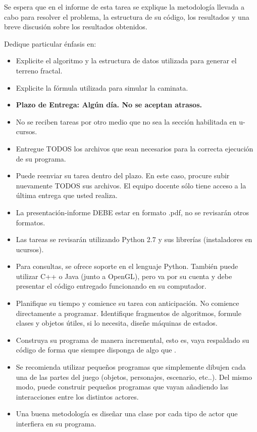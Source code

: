 \documentclass[letterpaper,11pt]{article} %
\def\plazoentrega {Algún día}
\begin{document}

Se espera que en el informe de esta tarea se explique la metodología llevada a cabo para resolver el problema, la estructura de su código, los resultados y una breve discusión sobre los resultados obtenidos. 

\newp Dedique particular énfasis en:

\begin{itemize}
	\item Explicite el algoritmo y la estructura de datos utilizada para generar el terreno fractal.
	\item Explicite la fórmula utilizada para simular la caminata.
\end{itemize}


\begin{itemize}
	\item \textbf{Plazo de Entrega: \plazoentrega. No se aceptan atrasos.}
	\item No se reciben tareas por otro medio que no sea la sección habilitada en u-cursos.
	\item Entregue TODOS los archivos que sean necesarios para la correcta ejecución de su programa.
	\item Puede reenviar su tarea dentro del plazo. En este caso, procure subir nuevamente TODOS sus archivos. El equipo docente sólo tiene acceso a la última entrega que usted realiza.
	\item La presentación-informe DEBE estar en formato .pdf, no se revisarán otros formatos.
	\item Las tareas se revisarán utilizando Python 2.7 y sus librerías (instaladores en ucursos).
	\item Para consultas, se ofrece soporte en el lenguaje Python. También puede utilizar C++ o Java (junto a OpenGL), pero va por su cuenta y debe presentar el código entregado funcionando en su computador.
\end{itemize}


\begin{itemize}
	\item Planifique su tiempo y comience su tarea con anticipación. No comience directamente a programar. Identifique fragmentos de algoritmos, formule clases y objetos útiles, si lo necesita, diseñe máquinas de estados.
	\item Construya su programa de manera incremental, esto es, vaya respaldado su código de forma que siempre disponga de algo que .
	\item Se recomienda utilizar pequeños programas que simplemente dibujen cada una de las partes del juego (objetos, personajes, escenario, etc..). Del mismo modo, puede construir pequeños programas que vayan añadiendo las interacciones entre los distintos actores.
	\item Una buena metodología es diseñar una clase por cada tipo de actor que interfiera en su programa.
\end{itemize}

\end{document}
